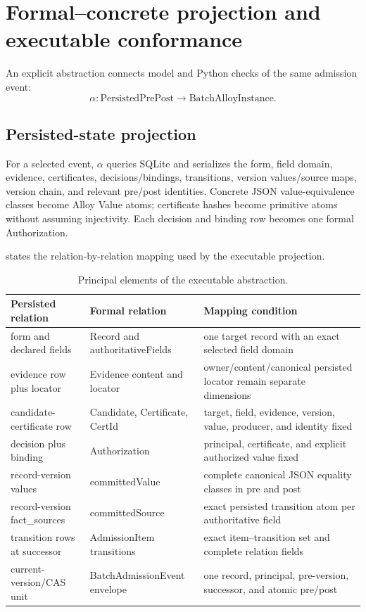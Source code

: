 \section{Formal--concrete projection and executable conformance}
\label{sec:conformance}

An explicit abstraction connects model and Python checks of the same admission event:
\begin{equation}
\alpha:\mathrm{PersistedPrePost}\rightarrow\mathrm{BatchAlloyInstance}.
\end{equation}

\subsection{Persisted-state projection}

For a selected event, $\alpha$ queries SQLite and serializes the form, field domain, evidence, certificates, decisions/bindings, transitions, version values/source maps, version chain, and relevant pre/post identities. Concrete JSON value-equivalence classes become Alloy Value atoms; certificate hashes become primitive  atoms without assuming injectivity. Each decision and binding row becomes one formal Authorization.

 states the relation-by-relation mapping used by the executable projection.

\begin{table}[t]
\centering
\caption{Principal elements of the executable abstraction.}
\label{tab:abstraction}
\begin{tabularx}{\textwidth}{@{}>{\raggedright\arraybackslash}p{}>{\raggedright\arraybackslash}p{}>{\raggedright\arraybackslash}X@{}}
\toprule
Persisted relation & Formal relation & Mapping condition \\
\midrule
form and declared fields & Record and authoritativeFields & one target record with an exact selected field domain \\
evidence row plus locator & Evidence content and locator & owner/content/canonical persisted locator remain separate dimensions \\
candidate-certificate row & Candidate, Certificate, CertId & target, field, evidence, version, value, producer, and identity fixed \\
decision plus binding & Authorization & principal, certificate, and explicit authorized value fixed \\
record-version values & committedValue & complete canonical JSON equality classes in pre and post \\
record-version fact\_sources & committedSource & exact persisted transition atom per authoritative field \\
transition rows at successor & AdmissionItem transitions & exact item--transition set and complete relation fields \\
current-version/CAS unit & BatchAdmissionEvent envelope & one record, principal, pre-version, successor, and atomic pre/post \\
\bottomrule
\end{tabularx}
\end{table}

